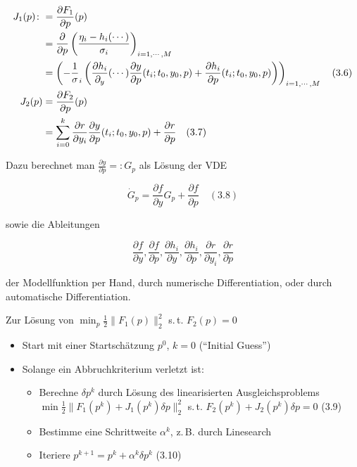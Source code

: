 \begin{align*}
J_1(p) \colon&= \frac{\partial F_1}{\partial p} (p) \\
&= \frac{\partial}{\partial p} \left( \frac{\eta_i - h_i(\cdots)}{\sigma_i} \right)_{i=1,\cdots,M} \\
&= \left( -\frac 1 \sigma_i \left( \frac{\partial h_i}{\partial_y} (\cdots) \frac{\partial y}{\partial p}(t_i; t_0, y_0, p) + \frac{\partial h_i}{\partial p} (t_i; t_0, y_0, p) \right) \right)_{i=1,\cdots,M} \quad (3.6)\\
J_2(p) &= \frac{\partial F_2}{\partial p} (p) \\
&= \sum_{i=0}^k \frac{\partial r}{\partial y_i} \frac{\partial y}{\partial p} (t_i; t_0, y_0, p) + \frac{\partial r}{\partial p} \quad (3.7)
\end{align*}

Dazu berechnet man $\tfrac{\partial y}{\partial p} =: G_p$ als Lösung der VDE

\[ \dot G_p = \frac{\partial f}{\partial y} G_p + \frac{\partial f}{\partial p} \quad (3.8)\]

sowie die Ableitungen

\[ \frac{\partial f}{\partial y}, \frac{\partial f}{\partial p}, \frac{\partial h_i}{\partial y}, \frac{\partial h_i}{\partial p}, \frac{\partial r}{\partial y_i}, \frac{\partial r}{\partial p}\]

der Modellfunktion per Hand, durch numerische Differentiation, oder durch automatische Differentiation.


Zur Lösung von $\min_p \tfrac 12 \|F_1(p)\|_2^2$ s.\,t. $F_2(p) = 0$

\begin{itemize}
\item Start mit einer Startschätzung $p^0$, $k=0$ ("`Initial Guess"')
\item Solange ein Abbruchkriterium verletzt ist:
\begin{itemize}
\item Berechne $\delta p^k$ durch Lösung des linearisierten Ausgleichsproblems $\min \tfrac 12 \|F_1(p^k) + J_1(p^k) \delta p\|_2^2$ s.\,t. $F_2(p^k) + J_2(p^k) \delta p = 0$ (3.9)
\item Bestimme eine Schrittweite $\alpha^k$, z.\,B. durch Linesearch 
\item Iteriere $p^{k+1} = p^k + \alpha^k \delta p^k$ (3.10)
\end{itemize} 
\end{itemize}

